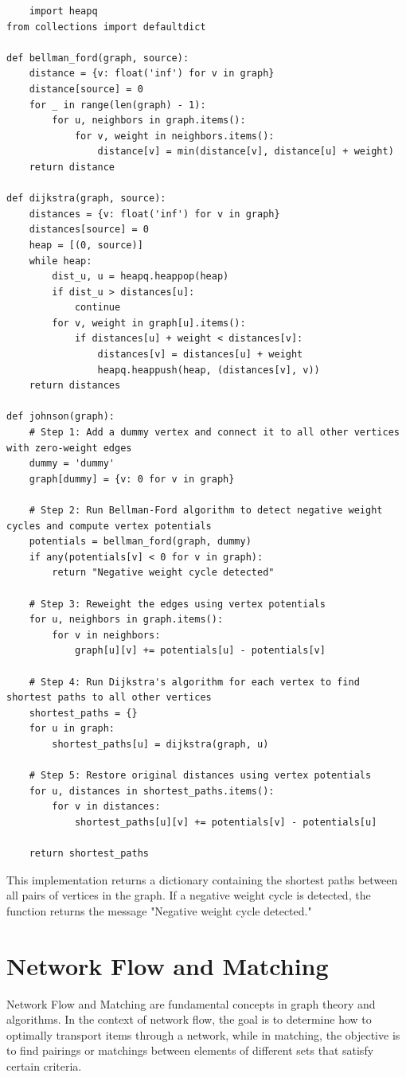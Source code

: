 \documentclass[12pt]{book} %
\begin{document}
\begin{lstlisting}
    import heapq
from collections import defaultdict

def bellman_ford(graph, source):
    distance = {v: float('inf') for v in graph}
    distance[source] = 0
    for _ in range(len(graph) - 1):
        for u, neighbors in graph.items():
            for v, weight in neighbors.items():
                distance[v] = min(distance[v], distance[u] + weight)
    return distance

def dijkstra(graph, source):
    distances = {v: float('inf') for v in graph}
    distances[source] = 0
    heap = [(0, source)]
    while heap:
        dist_u, u = heapq.heappop(heap)
        if dist_u > distances[u]:
            continue
        for v, weight in graph[u].items():
            if distances[u] + weight < distances[v]:
                distances[v] = distances[u] + weight
                heapq.heappush(heap, (distances[v], v))
    return distances

def johnson(graph):
    # Step 1: Add a dummy vertex and connect it to all other vertices with zero-weight edges
    dummy = 'dummy'
    graph[dummy] = {v: 0 for v in graph}

    # Step 2: Run Bellman-Ford algorithm to detect negative weight cycles and compute vertex potentials
    potentials = bellman_ford(graph, dummy)
    if any(potentials[v] < 0 for v in graph):
        return "Negative weight cycle detected"

    # Step 3: Reweight the edges using vertex potentials
    for u, neighbors in graph.items():
        for v in neighbors:
            graph[u][v] += potentials[u] - potentials[v]

    # Step 4: Run Dijkstra's algorithm for each vertex to find shortest paths to all other vertices
    shortest_paths = {}
    for u in graph:
        shortest_paths[u] = dijkstra(graph, u)

    # Step 5: Restore original distances using vertex potentials
    for u, distances in shortest_paths.items():
        for v in distances:
            shortest_paths[u][v] += potentials[v] - potentials[u]

    return shortest_paths
\end{lstlisting}
\FloatBarrier
This implementation returns a dictionary containing the shortest paths between all pairs of vertices in the graph. If a negative weight cycle is detected, the function returns the message "Negative weight cycle detected."

\section{Network Flow and Matching}
Network Flow and Matching are fundamental concepts in graph theory and algorithms. In the context of network flow, the goal is to determine how to optimally transport items through a network, while in matching, the objective is to find pairings or matchings between elements of different sets that satisfy certain criteria.
\end{document}

